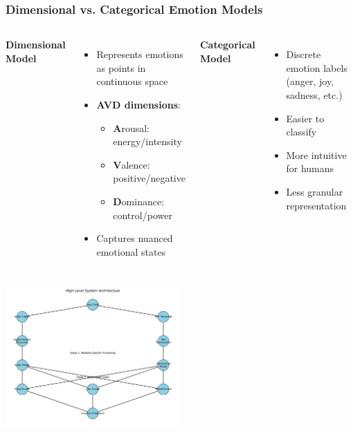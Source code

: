 \documentclass{beamer}
\begin{document}
\begin{frame}
\frametitle{Dimensional vs. Categorical Emotion Models}
\begin{columns}
\textbf{Dimensional Model}
\begin{itemize}
    \item Represents emotions as points in continuous space
    \item \textbf{AVD dimensions}:
    \begin{itemize}
        \item \textbf{A}rousal: energy/intensity
        \item \textbf{V}alence: positive/negative
        \item \textbf{D}ominance: control/power
    \end{itemize}
    \item Captures nuanced emotional states
\end{itemize}

\textbf{Categorical Model}
\begin{itemize}
    \item Discrete emotion labels (anger, joy, sadness, etc.)
    \item Easier to classify
    \item More intuitive for humans
    \item Less granular representation
\end{itemize}
\end{columns}

\begin{center}
\includegraphics[width=0.5\textwidth]{figures/system_architecture.png}
\end{center}
\end{frame}
\end{document}
